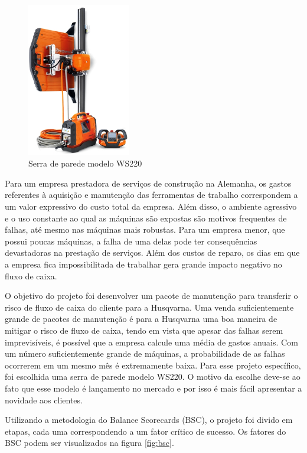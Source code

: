 \documentclass[12pt]{article}
\begin{document}
\begin{figure}[!ht]
	\centering
	\includegraphics[width=0.4\textwidth]{img/ws220_produto.png}
	\caption{Serra de parede modelo WS220}
	\label{fig:ws220_produto}
\end{figure}

	Para um empresa prestadora de serviços de construção na Alemanha, os gastos referentes à aquisição e manutenção das ferramentas de trabalho correspondem a um valor expressivo do custo total da empresa. Além disso, o ambiente agressivo e o uso constante ao qual as máquinas são expostas são motivos frequentes de falhas, até mesmo nas máquinas mais robustas. Para um empresa menor, que possui poucas máquinas, a falha de uma delas pode ter consequências devastadoras na prestação de serviços. Além dos custos de reparo, os dias em que a empresa fica impossibilitada de trabalhar gera grande impacto negativo no fluxo de caixa.

	O objetivo do projeto foi desenvolver um pacote de manutenção para transferir o risco de fluxo de caixa do cliente para a Husqvarna. Uma venda suficientemente grande de pacotes de manutenção é para a Husqvarna uma boa maneira de mitigar o risco de fluxo de caixa, tendo em vista que apesar das falhas serem imprevisíveis, é possível que a empresa calcule uma média de gastos anuais. Com um número suficientemente grande de máquinas, a probabilidade de as falhas ocorrerem em um mesmo mês é extremamente baixa. Para esse projeto específico, foi escolhida uma serra de parede modelo WS220. O motivo da escolhe deve-se ao fato que esse modelo é lançamento no mercado e por isso é mais fácil apresentar a novidade aos clientes.

	Utilizando a metodologia do Balance Scorecards (BSC), o projeto foi divido em etapas, cada uma correspondendo a um fator crítico de sucesso. Os fatores do BSC podem ser visualizados na figura \ref{fig:bsc}. 
	
\end{document}
